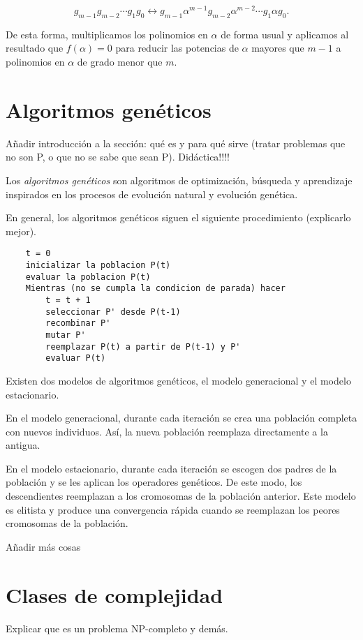 $$g_{m-1} g_{m-2} \cdots g_1 g_0 \leftrightarrow  g_{m-1} \alpha^{m-1} g_{m-2} \alpha^{m-2}\cdots g_1 \alpha g_0.$$

De esta forma, multiplicamos los polinomios en $\alpha$ de forma usual y aplicamos al resultado que $f(\alpha) = 0$ para reducir las potencias de $\alpha$ mayores que $m-1$ a polinomios en $\alpha$ de grado menor que $m$.

\section{Algoritmos genéticos}

Añadir introducción a la sección: qué es y para qué sirve (tratar problemas que no son P, o que no se sabe que sean P). Didáctica!!!!

Los \emph{algoritmos genéticos} son algoritmos de optimización, búsqueda y aprendizaje inspirados en los procesos de evolución 
natural y evolución genética.

En general, los algoritmos genéticos siguen el siguiente procedimiento (explicarlo mejor).

\begin{lstlisting}
    t = 0
    inicializar la poblacion P(t)
    evaluar la poblacion P(t)
    Mientras (no se cumpla la condicion de parada) hacer 
        t = t + 1
        seleccionar P' desde P(t-1)
        recombinar P'
        mutar P'
        reemplazar P(t) a partir de P(t-1) y P'
        evaluar P(t)
\end{lstlisting}

Existen dos modelos de algoritmos genéticos, el modelo generacional y el modelo estacionario.

En el modelo generacional, durante cada iteración se crea una población completa con nuevos individuos.
Así, la nueva población reemplaza directamente a la antigua.

En el modelo estacionario, durante cada iteración se escogen dos padres de la población y se les aplican los operadores genéticos.
De este modo, los descendientes reemplazan a los cromosomas de la población anterior.
Este modelo es elitista y produce una convergencia rápida cuando se reemplazan los peores cromosomas de la población.

Añadir más cosas


\section{Clases de complejidad}

Explicar que es un problema NP-completo y demás.